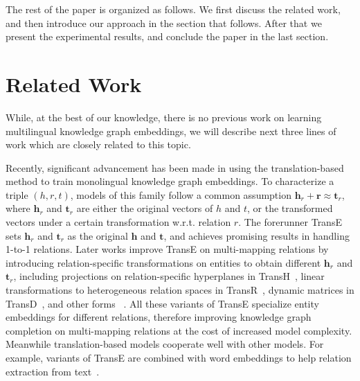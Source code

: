 \documentclass{article}
\def\inv{\vspace{-0.1cm}}
\begin{document}
The rest of the paper is organized as follows. We first discuss the related work, and then introduce our approach in the section that follows. After that we present the experimental results, and conclude the paper in the last section.


\newcommand{\stitle}[1]{\vspace{0.3ex}\noindent{\bf #1}}

\inv
\section{Related Work} \label{sec:related}



While, at the best of our knowledge, there is no previous work on learning multilingual knowledge graph embeddings, we will describe next three lines of work which are closely related to this topic.\par

\stitle{Knowledge Graph Embeddings.} Recently, significant advancement has been made in using the translation-based method to train monolingual knowledge graph embeddings. To characterize a triple $(h, r, t)$, models of this family follow a common assumption $\mathbf{h}_r + \mathbf{r} \approx \mathbf{t}_r$,
where $\mathbf{h}_r$ and $\mathbf{t}_r$ are either the original vectors of $h$ and $t$, or the transformed vectors under a certain transformation w.r.t. relation $r$.
The forerunner
TransE~\cite{bordes2013translating} sets $\mathbf{h}_r$ and $\mathbf{t}_r$ as the original $\mathbf{h}$ and $\mathbf{t}$,
and achieves promising results in handling 1-to-1 relations. Later works improve TransE on multi-mapping relations by introducing
relation-specific transformations on entities
to obtain different $\mathbf{h}_r$ and $\mathbf{t}_r$, including projections on relation-specific hyperplanes in TransH~\cite{wang2014knowledge},
linear transformations to heterogeneous relation spaces in TransR~\cite{lin2015learning}, dynamic matrices in TransD~\cite{ji2015knowledge}, and other forms
~\cite{jia2016locally,nguyenstranse}.
All these variants of TransE specialize
entity embeddings for different relations,
therefore improving knowledge graph completion on multi-mapping relations at the cost of increased model complexity. Meanwhile translation-based models cooperate well with other models. For example, variants of TransE are combined with word embeddings to help relation extraction from text~\cite{westonconnecting,zhong2015aligning}. \par
\end{document}
